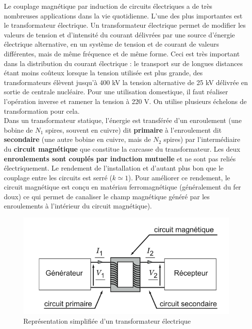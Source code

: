 \documentclass[11pt,a4paper]{report}
\begin{document}
Le couplage magnétique par induction de circuits électriques a de très nombreuses applications dans la vie quotidienne. L'une des plus importantes est le transformateur électrique. Un transformateur électrique permet de modifier les valeurs de tension et d'intensité du courant délivrées par une source d'énergie électrique alternative, en un système de tension et de courant de valeurs différentes, mais de même fréquence et de même forme. Ceci est très important dans la distribution du courant électrique : le transport sur de longues distances étant moins coûteux lorsque la tension utilisée est plus grande, des transformateurs élèvent jusqu'à 400 kV la tension alternative de 25 kV délivrée en sortie de centrale nucléaire. Pour une utilisation domestique, il faut réaliser l'opération inverse et ramener la tension à 220 V. On utilise plusieurs échelons de transformation pour cela.\\

Dans un transformateur statique, l'énergie est transférée d'un enroulement (une bobine de $N_1$ spires, souvent en cuivre) dit \textbf{primaire} à l'enroulement dit \textbf{secondaire} (une autre bobine en cuivre, mais de $N_2$ spires) par l'intermédiaire du \textbf{circuit magnétique} que constitue la carcasse du transformateur. Les deux \textbf{enroulements sont couplés par induction mutuelle} et ne sont pas reliés électriquement. Le rendement de l'installation et d'autant plus bon que le couplage entre les circuits est serré ($k \simeq 1$). Pour améliorer ce rendement, le circuit magnétique est conçu en matériau ferromagnétique (généralement du fer doux) ce qui permet de canaliser le champ magnétique généré par les enroulements à l'intérieur du circuit magnétique).

\begin{figure}[h!]
	\begin{center}
		\includegraphics[scale = 0.4]{transfo.png}
		\caption{Représentation simplifiée d'un transformateur électrique} 
		\label{fig:transfo}
	\end{center}
\end{figure}
\end{document}
